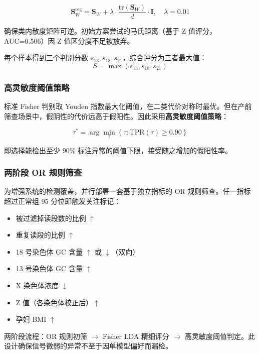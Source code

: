 \documentclass{mcm-paper}
\begin{document}
\begin{equation}
\mathbf{S}_W^{\text{reg}} = \mathbf{S}_W + \lambda \cdot \frac{\mathrm{tr}(\mathbf{S}_W)}{d} \cdot \mathbf{I}, \quad \lambda = 0.01
\end{equation}

确保类内散度矩阵可逆。初始方案尝试的马氏距离（基于 Z 值评分，AUC=0.506）因 Z 值区分度不足被放弃。

每个样本得到三个判别分数 $s_{13}, s_{18}, s_{21}$，综合评分为三者最大值：
\begin{equation}
S = \max(s_{13}, s_{18}, s_{21})
\end{equation}

\subsubsection{高灵敏度阈值策略}

标准 Fisher 判别取 Youden 指数最大化阈值，在二类代价对称时最优。但在产前筛查场景中，假阴性的代价远高于假阳性。因此采用\textbf{高灵敏度阈值策略}：

\begin{equation}
\tau^* = \arg\min_{\tau} \left\{ \tau : \text{TPR}(\tau) \geq 0.90 \right\}
\end{equation}

即选择能检出至少 90\% 标注异常的阈值下限，接受随之增加的假阳性率。

\subsubsection{两阶段 OR 规则筛查}

为增强系统的检测覆盖，并行部署一套基于独立指标的 OR 规则筛查。任一指标超过正常组 95 分位即触发关注标记：

\begin{itemize}
    \item 被过滤掉读段数的比例 $\uparrow$
    \item 重复读段的比例 $\uparrow$
    \item 18 号染色体 GC 含量 $\uparrow$ 或 $\downarrow$（双向）
    \item 13 号染色体 GC 含量 $\uparrow$
    \item X 染色体浓度 $\downarrow$
    \item Z 值（各染色体校正后）$\uparrow$
    \item 孕妇 BMI $\uparrow$
\end{itemize}

两阶段流程：OR 规则初筛 $\to$ Fisher LDA 精细评分 $\to$ 高灵敏度阈值判定。此设计确保信号微弱的异常不至于因单模型偏好而漏检。
\end{document}
